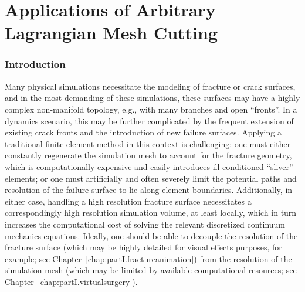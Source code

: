 %

\part{Applications of Arbitrary Lagrangian Mesh Cutting}

\renewcommand{\thechapter}{\thepart}

\section*{Introduction}

Many physical simulations necessitate the modeling of fracture or crack surfaces, and in the most demanding of these simulations, these surfaces may have a highly complex non-manifold topology, e.g., with many branches and open ``fronts''. In a dynamics scenario, this may be further complicated by the frequent extension of existing crack fronts and the introduction of new failure surfaces. Applying a traditional finite element method in this context is challenging: one must either constantly regenerate the simulation mesh to account for the fracture geometry, which is computationally expensive and easily introduces ill-conditioned ``sliver'' elements; or one must artificially and often severely limit the potential paths and resolution of the failure surface to lie along element boundaries. Additionally, in either case, handling a high resolution fracture surface necessitates a correspondingly high resolution simulation volume, at least locally, which in turn increases the computational cost of solving the relevant discretized continuum mechanics equations. Ideally, one should be able to decouple the resolution of the fracture surface (which may be highly detailed for visual effects purposes, for example; see Chapter~\ref{chap:partI.fractureanimation}) from the resolution of the simulation mesh (which may be limited by available computational resources; see Chapter~\ref{chap:partI.virtualsurgery}).

